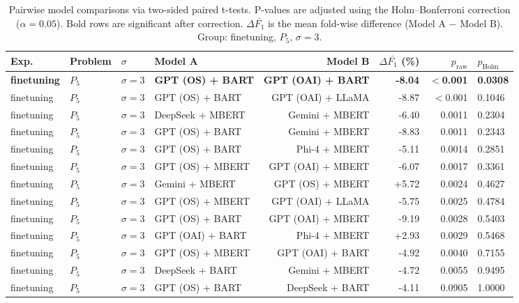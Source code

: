 \begin{table}[htbp]
\centering
\caption{Pairwise model comparisons via two-sided paired t-tests. P-values are adjusted using the Holm--Bonferroni correction ($\alpha = 0.05$). Bold rows are significant after correction. $\Delta\bar{F_1}$ is the mean fold-wise difference (Model A $-$ Model B). Group: finetuning, $P_5$, $\sigma{=}3$.}
\label{tab:holm_ttests_finetuning_p5_alpha3}
\begin{tabular*}{\textwidth}{@{\extracolsep{\fill}}llllrrrl}
\hline
\textbf{Exp.} & \textbf{Problem} & \textbf{$\sigma$} & \textbf{Model A} & \textbf{Model B} & \textbf{$\Delta \bar{F_1}$ (\%)} & \textbf{$p_\text{raw}$} & \textbf{$p_\text{Holm}$} \\
\hline
\textbf{finetuning} & \textbf{$P_5$} & \textbf{$\sigma{=}3$} & \textbf{GPT (OS) + BART} & \textbf{GPT (OAI) + BART} & \textbf{-8.04} & \textbf{$<$0.001} & \textbf{0.0308} \\
finetuning & $P_5$ & $\sigma{=}3$ & GPT (OS) + BART & GPT (OAI) + LLaMA & -8.87 & $<$0.001 & 0.1046 \\
finetuning & $P_5$ & $\sigma{=}3$ & DeepSeek + MBERT & Gemini + MBERT & -6.40 & 0.0011 & 0.2304 \\
finetuning & $P_5$ & $\sigma{=}3$ & GPT (OS) + BART & Gemini + MBERT & -8.83 & 0.0011 & 0.2343 \\
finetuning & $P_5$ & $\sigma{=}3$ & GPT (OS) + BART & Phi-4 + MBERT & -5.11 & 0.0014 & 0.2851 \\
finetuning & $P_5$ & $\sigma{=}3$ & GPT (OS) + MBERT & GPT (OAI) + MBERT & -6.07 & 0.0017 & 0.3361 \\
finetuning & $P_5$ & $\sigma{=}3$ & Gemini + MBERT & GPT (OS) + MBERT & +5.72 & 0.0024 & 0.4627 \\
finetuning & $P_5$ & $\sigma{=}3$ & GPT (OS) + MBERT & GPT (OAI) + LLaMA & -5.75 & 0.0025 & 0.4784 \\
finetuning & $P_5$ & $\sigma{=}3$ & GPT (OS) + BART & GPT (OAI) + MBERT & -9.19 & 0.0028 & 0.5403 \\
finetuning & $P_5$ & $\sigma{=}3$ & GPT (OAI) + BART & Phi-4 + MBERT & +2.93 & 0.0029 & 0.5468 \\
finetuning & $P_5$ & $\sigma{=}3$ & GPT (OS) + MBERT & GPT (OAI) + BART & -4.92 & 0.0040 & 0.7155 \\
finetuning & $P_5$ & $\sigma{=}3$ & DeepSeek + BART & Gemini + MBERT & -4.72 & 0.0055 & 0.9495 \\
finetuning & $P_5$ & $\sigma{=}3$ & GPT (OS) + BART & DeepSeek + BART & -4.11 & 0.0905 & 1.0000 \\

\end{tabular*}
\end{table}
